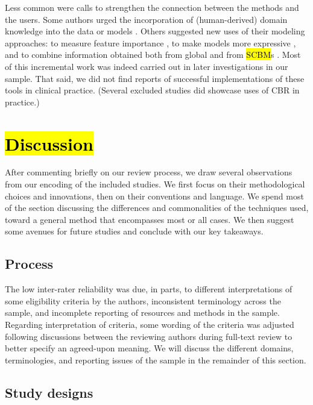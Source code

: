 \documentclass[sn-mathphys,Numbered,pdflatex]{sn-jnl}
\theoremstyle{remark}
\theoremstyle{definition}
\begin{document}
Less common were calls to strengthen the connection between the methods
and the users. Some authors urged the incorporation of (human-derived)
domain knowledge into the data or models \citep{Yearwood1997, Wang2019}.
Others suggested new uses of their modeling approaches: to measure
feature importance \citep{Wyns2004}, to make models more expressive
\citep{Lee2015}, and to combine information obtained both from global
and from \hl{SCBM}s \citep{Ng2015}. Most of this incremental work was
indeed carried out in later investigations in our sample. That said, we
did not find reports of successful implementations of these tools in
clinical practice. (Several excluded studies did showcase uses of CBR in
practice.)

\section{\texorpdfstring{\hl{Discussion}}{}}\label{section}

After commenting briefly on our review process, we draw several
observations from our encoding of the included studies. We first focus
on their methodological choices and innovations, then on their
conventions and language. We spend most of the section discussing the
differences and commonalities of the techniques used, toward a general
method that encompasses most or all cases. We then suggest some avenues
for future studies and conclude with our key takeaways.

\subsection{Process}\label{process}

The low inter-rater reliability was due, in parts, to different
interpretations of some eligibility criteria by the authors,
inconsistent terminology across the sample, and incomplete reporting of
resources and methods in the sample. Regarding interpretation of
criteria, some wording of the criteria was adjusted following
discussions between the reviewing authors during full-text review to
better specify an agreed-upon meaning. We will discuss the different
domains, terminologies, and reporting issues of the sample in the
remainder of this section.

\subsection{Study designs}\label{study-designs}
\end{document}
